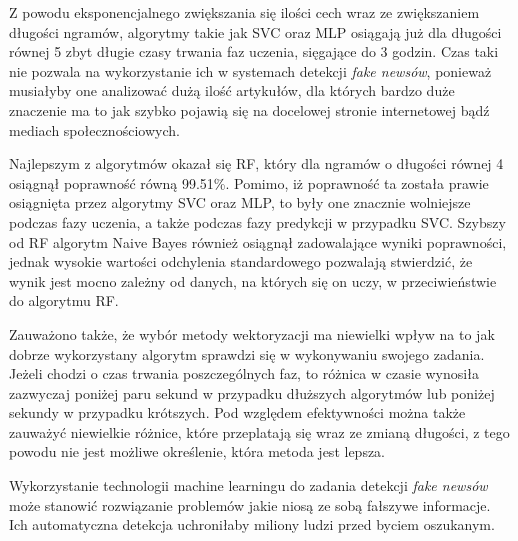 Z powodu eksponencjalnego zwiększania się ilości cech wraz ze zwiększaniem długości ngramów, 
algorytmy takie jak SVC oraz MLP osiągają już dla długości równej 5 zbyt długie czasy trwania faz uczenia, sięgające 
do 3 godzin. Czas taki nie pozwala na wykorzystanie ich w systemach detekcji \textit{fake newsów}, ponieważ
musiałyby one analizować dużą ilość artykułów, dla których bardzo duże znaczenie ma to jak 
szybko pojawią się na docelowej stronie internetowej bądź mediach społecznościowych.

Najlepszym z algorytmów okazał się RF, który dla ngramów o długości równej 4
osiągnął poprawność równą 99.51\%. Pomimo, iż poprawność ta została prawie osiągnięta przez algorytmy
SVC oraz MLP, to były one znacznie wolniejsze podczas fazy uczenia, a także podczas fazy 
predykcji w przypadku SVC. Szybszy od RF algorytm Naive Bayes również osiągnął zadowalające wyniki poprawności,
jednak wysokie wartości odchylenia standardowego pozwalają stwierdzić, że wynik jest mocno zależny od 
danych, na których się on uczy, w przeciwieństwie do algorytmu RF.

Zauważono także, że wybór metody wektoryzacji ma niewielki wpływ na to jak dobrze wykorzystany algorytm 
sprawdzi się w wykonywaniu swojego zadania. Jeżeli chodzi o czas trwania poszczególnych faz, to 
różnica w czasie wynosiła zazwyczaj poniżej paru sekund w przypadku dłuższych algorytmów lub poniżej 
sekundy w przypadku krótszych. Pod względem efektywności można także zauważyć niewielkie różnice,
które przeplatają się
wraz ze zmianą długości, z tego powodu nie jest możliwe określenie, która metoda jest lepsza.

Wykorzystanie technologii machine learningu do zadania detekcji \textit{fake newsów} 
może stanowić rozwiązanie problemów jakie niosą ze sobą fałszywe informacje. Ich automatyczna 
detekcja uchroniłaby miliony ludzi przed byciem oszukanym. 
